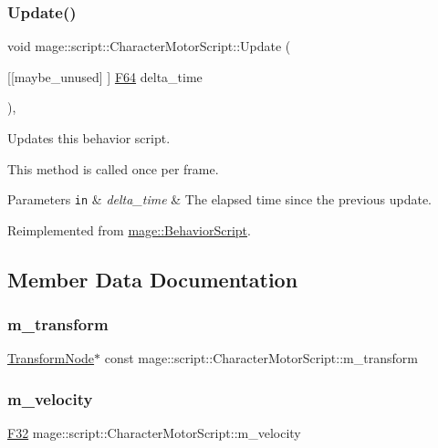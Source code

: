 \subsubsection{\texorpdfstring{Update()}{Update()}}
{\footnotesize\ttfamily void mage\+::script\+::\+Character\+Motor\+Script\+::\+Update (\begin{DoxyParamCaption}\item[{\mbox{[}\mbox{[}maybe\+\_\+unused\mbox{]} \mbox{]} \hyperlink{namespacemage_ad26233bbec640deda836e572c1a23708}{F64}}]{delta\+\_\+time }\end{DoxyParamCaption})\hspace{0.3cm}{\ttfamily [override]}, {\ttfamily [virtual]}}

Updates this behavior script.

This method is called once per frame.


\begin{DoxyParams}[1]{Parameters}
\mbox{\tt in}  & {\em delta\+\_\+time} & The elapsed time since the previous update. \\
\hline
\end{DoxyParams}


Reimplemented from \hyperlink{classmage_1_1_behavior_script_afb9cf3759edf8876416d1df85489cba6}{mage\+::\+Behavior\+Script}.



\subsection{Member Data Documentation}
\hypertarget{classmage_1_1script_1_1_character_motor_script_adf11fdad0fc73ef1ae829d4d781f2b0c}{}\label{classmage_1_1script_1_1_character_motor_script_adf11fdad0fc73ef1ae829d4d781f2b0c} 
\subsubsection{\texorpdfstring{m\+\_\+transform}{m\_transform}}
{\footnotesize\ttfamily \hyperlink{classmage_1_1_transform_node}{Transform\+Node}$\ast$ const mage\+::script\+::\+Character\+Motor\+Script\+::m\+\_\+transform\hspace{0.3cm}{\ttfamily [private]}}

\hypertarget{classmage_1_1script_1_1_character_motor_script_a30db45f04bc56380729af037e71ff237}{}\label{classmage_1_1script_1_1_character_motor_script_a30db45f04bc56380729af037e71ff237} 
\subsubsection{\texorpdfstring{m\+\_\+velocity}{m\_velocity}}
{\footnotesize\ttfamily \hyperlink{namespacemage_aa97e833b45f06d60a0a9c4fc22ae02c0}{F32} mage\+::script\+::\+Character\+Motor\+Script\+::m\+\_\+velocity\hspace{0.3cm}{\ttfamily [private]}}

